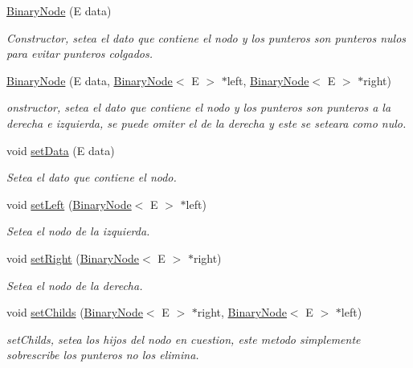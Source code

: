 \begin{DoxyCompactItemize}
\item 
\hyperlink{classBinaryNode_a770d00114c87b6e4b8ebb50c9bd24272}{Binary\-Node} (E data)
\begin{DoxyCompactList}\small\item\em Constructor, setea el dato que contiene el nodo y los punteros son punteros nulos para evitar punteros colgados. \end{DoxyCompactList}\item 
\hyperlink{classBinaryNode_a5b208d4006198d37d5ec0824af740e9f}{Binary\-Node} (E data, \hyperlink{classBinaryNode}{Binary\-Node}$<$ E $>$ $\ast$left, \hyperlink{classBinaryNode}{Binary\-Node}$<$ E $>$ $\ast$right)
\begin{DoxyCompactList}\small\item\em onstructor, setea el dato que contiene el nodo y los punteros son punteros a la derecha e izquierda, se puede omiter el de la derecha y este se seteara como nulo. \end{DoxyCompactList}\item 
void \hyperlink{classBinaryNode_ad4d399a6fe4841baabfeef875e2c5bd3}{set\-Data} (E data)
\begin{DoxyCompactList}\small\item\em Setea el dato que contiene el nodo. \end{DoxyCompactList}\item 
void \hyperlink{classBinaryNode_a0ac78ba2fb207003c18951977b7345c5}{set\-Left} (\hyperlink{classBinaryNode}{Binary\-Node}$<$ E $>$ $\ast$left)
\begin{DoxyCompactList}\small\item\em Setea el nodo de la izquierda. \end{DoxyCompactList}\item 
void \hyperlink{classBinaryNode_a59e5b3d0213b13e4e35ded03bbda7da2}{set\-Right} (\hyperlink{classBinaryNode}{Binary\-Node}$<$ E $>$ $\ast$right)
\begin{DoxyCompactList}\small\item\em Setea el nodo de la derecha. \end{DoxyCompactList}\item 
void \hyperlink{classBinaryNode_a2f042cb3740f988f889ec140658c448e}{set\-Childs} (\hyperlink{classBinaryNode}{Binary\-Node}$<$ E $>$ $\ast$right, \hyperlink{classBinaryNode}{Binary\-Node}$<$ E $>$ $\ast$left)
\begin{DoxyCompactList}\small\item\em set\-Childs, setea los hijos del nodo en cuestion, este metodo simplemente sobrescribe los punteros no los elimina. \end{DoxyCompactList}\item 

\end{DoxyCompactItemize}
